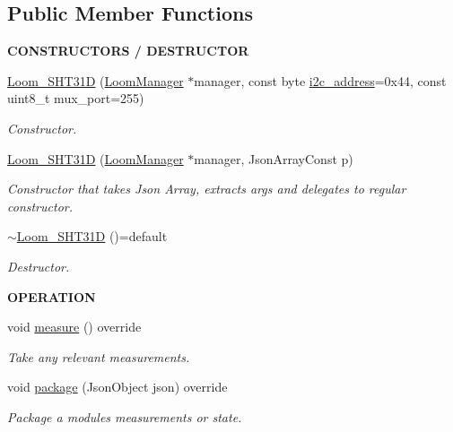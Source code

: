 \subsection*{Public Member Functions}
\begin{Indent}{\bf C\+O\+N\+S\+T\+R\+U\+C\+T\+O\+RS / D\+E\+S\+T\+R\+U\+C\+T\+OR}\par
\begin{DoxyCompactItemize}
\item 
\hyperlink{class_loom___s_h_t31_d_ac9816269b6bffad6aa2082953fdc23d0}{Loom\+\_\+\+S\+H\+T31D} (\hyperlink{class_loom_manager}{Loom\+Manager} $\ast$manager, const byte \hyperlink{class_loom_i2_c_sensor_a6ff389c1f015152a9ebfccb037d3d90e}{i2c\+\_\+address}=0x44, const uint8\+\_\+t mux\+\_\+port=255)
\begin{DoxyCompactList}\small\item\em Constructor. \end{DoxyCompactList}\item 
\hyperlink{class_loom___s_h_t31_d_abe5fe61b4abf126db72ca93e1ead1c37}{Loom\+\_\+\+S\+H\+T31D} (\hyperlink{class_loom_manager}{Loom\+Manager} $\ast$manager, Json\+Array\+Const p)
\begin{DoxyCompactList}\small\item\em Constructor that takes Json Array, extracts args and delegates to regular constructor. \end{DoxyCompactList}\item 
\hyperlink{class_loom___s_h_t31_d_af45193126a6098182debaebe705de907}{$\sim$\+Loom\+\_\+\+S\+H\+T31D} ()=default
\begin{DoxyCompactList}\small\item\em Destructor. \end{DoxyCompactList}\end{DoxyCompactItemize}
\end{Indent}
\begin{Indent}{\bf O\+P\+E\+R\+A\+T\+I\+ON}\par
\begin{DoxyCompactItemize}
\item 
void \hyperlink{class_loom___s_h_t31_d_aab6d83a01ddb09428aaa8440d7b667a4}{measure} () override
\begin{DoxyCompactList}\small\item\em Take any relevant measurements. \end{DoxyCompactList}\item 
void \hyperlink{class_loom___s_h_t31_d_a0fd16cdcaf91721d68a7a882656c9551}{package} (Json\+Object json) override
\begin{DoxyCompactList}\small\item\em Package a modules measurements or state. \end{DoxyCompactList}\end{DoxyCompactItemize}
\end{Indent}
